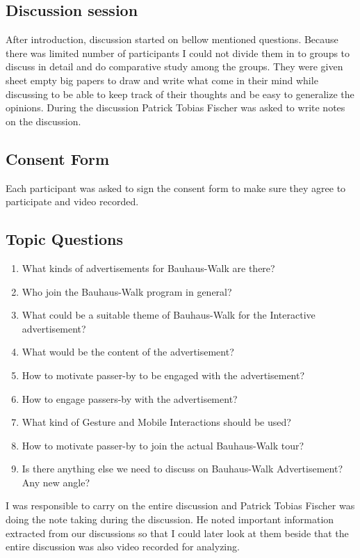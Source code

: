 \subsection{Discussion session}
After introduction, discussion started on bellow mentioned questions. Because there was limited number of participants I could not divide them in to groups to discuss in detail and do comparative study among the groups. They were given sheet empty big papers to draw and write what come in their mind while discussing to be able to keep track of their thoughts and be easy to generalize the opinions. During the discussion Patrick Tobias Fischer was asked to write notes on the discussion.

\subsection{Consent Form}
Each participant was asked to sign the consent form to make sure they agree to participate and video recorded.

\subsection{Topic Questions}


\begin{enumerate}
\item	What kinds of advertisements for Bauhaus-Walk are there?
\item	Who join the Bauhaus-Walk program in general?
\item	What could be a suitable theme of Bauhaus-Walk for the Interactive advertisement?
\item	What would be the content of the advertisement?
\item	How to motivate passer-by to be engaged with the advertisement?
\item	How to engage passers-by with the advertisement?
\item	What kind of Gesture and Mobile Interactions should be used?
\item	How to motivate passer-by to join the actual Bauhaus-Walk tour?
\item	Is there anything else we need to discuss on Bauhaus-Walk Advertisement? Any new angle?

\end{enumerate}

I was responsible to carry on the entire discussion and Patrick Tobias Fischer was doing the note taking during the discussion. He noted important information extracted from our discussions so that I could later look at them beside that the entire discussion was also video recorded for analyzing.


